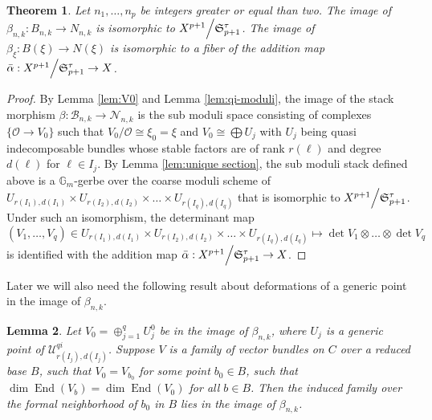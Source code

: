 \documentclass[reqno]{amsart}
\newtheorem{theorem}{Theorem}[section]
\newtheorem{lemma}[theorem]{Lemma}
\theoremstyle{definition}
\theoremstyle{remark}
\newcommand{\G}{{\mathbb G}}
\newcommand{\ot}{\otimes}
\newcommand{\UU}{{\mathcal U}}
\newcommand{\End}{\operatorname{End}}
\newcommand{\cO}{\mathcal{O}}
\newcommand{\sB}{\mathscr{B}}
\newcommand{\sN}{\mathscr{N}}
\newcommand{\fS}{\mathfrak{S}}
\numberwithin{equation}{section}
\begin{document}
\begin{theorem}\label{thm:general ni}
Let $n_1,\ldots,n_p$ be integers greater or equal than two. The image of $\beta_{n,k}: B_{n,k}\to N_{n,k}$ is isomorphic to $X^{p+1}\Big\slash \fS^\tau_{p+1}$. 
The image of $\beta_\xi: B(\xi)\to N(\xi)$ is isomorphic to a fiber of the addition map $\bar{\alpha}: X^{p+1}\Big\slash \fS^\tau_{p+1}\to X$.
\end{theorem}
\begin{proof}
By Lemma \ref{lem:V0} and Lemma \ref{lem:qi-moduli}, the image of the stack morphism $\beta: \sB_{n,k}\to \sN_{n,k}$ is the sub moduli space consisting of complexes $\{\cO\to V_0\}$ such that $V_0/\cO\cong \xi_0=\xi$ and $V_0\cong \bigoplus U_j$ with $U_j$ being quasi indecomposable bundles whose stable factors are of rank $r(\ell)$ and degree $d(\ell)$ for $\ell\in I_j$. By Lemma \ref{lem:unique section}, the sub moduli stack defined above is a $\G_m$-gerbe over the coarse moduli scheme of $U_{r(I_1), d(I_1)}\times U_{r(I_2), d(I_2)}\times\ldots\times U_{r(I_q), d(I_q)}$ that is isomorphic to $X^{p+1}\Big\slash \fS^\tau_{p+1}$. 
Under such an isomorphism, the determinant map 
\[ (V_1,\ldots,V_q)\in U_{r(I_1), d(I_1)}\times U_{r(I_2), d(I_2)}\times\ldots\times U_{r(I_q), d(I_q)}\mapsto \det V_1\ot\ldots\ot\det V_q \] is identified with the addition map $\bar{\alpha}: X^{p+1}\Big\slash \fS^\tau_{p+1}\to X$.
\end{proof}

Later we will also need the following result about deformations of a generic point in the image of $\beta_{n,k}$.

\begin{lemma}\label{qi-formal-lem}
Let $V_0=\oplus_{j=1}^q U^0_j$ be in the image of $\beta_{n,k}$, where $U_j$ is a generic point of $\UU^{qi}_{r(I_j),d(I_j)}$. Suppose
$V$ is a family of vector bundles on $C$ over a reduced base $B$, such that $V_0=V_{b_0}$ for some point $b_0\in B$, such that
$\dim\End(V_b)=\dim \End(V_0)$ for all $b\in B$. Then the induced family over the formal neighborhood of $b_0$ in $B$ lies in the image of $\beta_{n,k}$.
\end{lemma}
\end{document}
